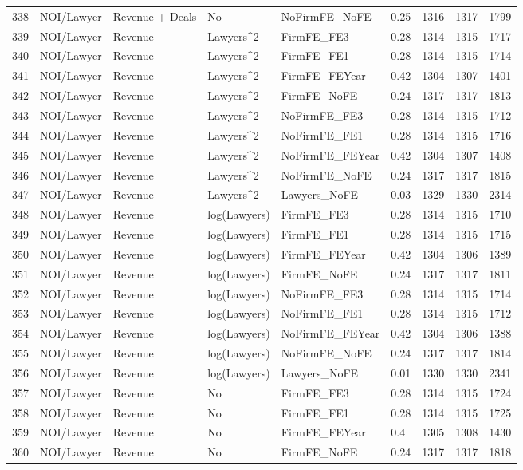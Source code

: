 \documentclass{article}
\begin{document}
\begin{table}[H]
\begin{tabular}{rllllllll}
  338 & NOI/Lawyer & Revenue + Deals & No & NoFirmFE\_NoFE & 0.25 & 1316 & 1317 & 1799 \\ 
  339 & NOI/Lawyer & Revenue & Lawyers^2 & FirmFE\_FE3 & 0.28 & 1314 & 1315 & 1717 \\ 
  340 & NOI/Lawyer & Revenue & Lawyers^2 & FirmFE\_FE1 & 0.28 & 1314 & 1315 & 1714 \\ 
  341 & NOI/Lawyer & Revenue & Lawyers^2 & FirmFE\_FEYear & 0.42 & 1304 & 1307 & 1401 \\ 
  342 & NOI/Lawyer & Revenue & Lawyers^2 & FirmFE\_NoFE & 0.24 & 1317 & 1317 & 1813 \\ 
  343 & NOI/Lawyer & Revenue & Lawyers^2 & NoFirmFE\_FE3 & 0.28 & 1314 & 1315 & 1712 \\ 
  344 & NOI/Lawyer & Revenue & Lawyers^2 & NoFirmFE\_FE1 & 0.28 & 1314 & 1315 & 1716 \\ 
  345 & NOI/Lawyer & Revenue & Lawyers^2 & NoFirmFE\_FEYear & 0.42 & 1304 & 1307 & 1408 \\ 
  346 & NOI/Lawyer & Revenue & Lawyers^2 & NoFirmFE\_NoFE & 0.24 & 1317 & 1317 & 1815 \\ 
  347 & NOI/Lawyer & Revenue & Lawyers^2 & Lawyers\_NoFE & 0.03 & 1329 & 1330 & 2314 \\ 
  348 & NOI/Lawyer & Revenue & log(Lawyers) & FirmFE\_FE3 & 0.28 & 1314 & 1315 & 1710 \\ 
  349 & NOI/Lawyer & Revenue & log(Lawyers) & FirmFE\_FE1 & 0.28 & 1314 & 1315 & 1715 \\ 
  350 & NOI/Lawyer & Revenue & log(Lawyers) & FirmFE\_FEYear & 0.42 & 1304 & 1306 & 1389 \\ 
  351 & NOI/Lawyer & Revenue & log(Lawyers) & FirmFE\_NoFE & 0.24 & 1317 & 1317 & 1811 \\ 
  352 & NOI/Lawyer & Revenue & log(Lawyers) & NoFirmFE\_FE3 & 0.28 & 1314 & 1315 & 1714 \\ 
  353 & NOI/Lawyer & Revenue & log(Lawyers) & NoFirmFE\_FE1 & 0.28 & 1314 & 1315 & 1712 \\ 
  354 & NOI/Lawyer & Revenue & log(Lawyers) & NoFirmFE\_FEYear & 0.42 & 1304 & 1306 & 1388 \\ 
  355 & NOI/Lawyer & Revenue & log(Lawyers) & NoFirmFE\_NoFE & 0.24 & 1317 & 1317 & 1814 \\ 
  356 & NOI/Lawyer & Revenue & log(Lawyers) & Lawyers\_NoFE & 0.01 & 1330 & 1330 & 2341 \\ 
  357 & NOI/Lawyer & Revenue & No & FirmFE\_FE3 & 0.28 & 1314 & 1315 & 1724 \\ 
  358 & NOI/Lawyer & Revenue & No & FirmFE\_FE1 & 0.28 & 1314 & 1315 & 1725 \\ 
  359 & NOI/Lawyer & Revenue & No & FirmFE\_FEYear & 0.4 & 1305 & 1308 & 1430 \\ 
  360 & NOI/Lawyer & Revenue & No & FirmFE\_NoFE & 0.24 & 1317 & 1317 & 1818 \\ 
   \hline
\end{tabular}
\end{table}
\end{document}
